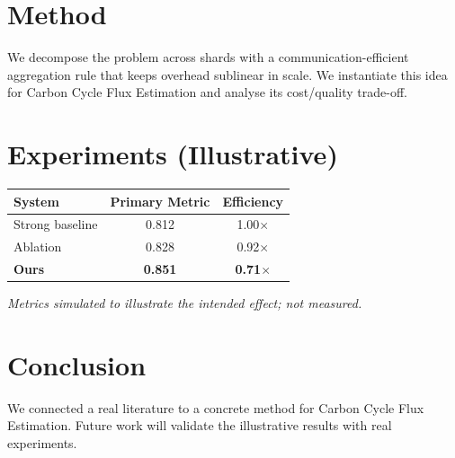 \documentclass[11pt]{article}
\begin{document}
\section{Method}
We decompose the problem across shards with a communication-efficient aggregation rule that keeps overhead sublinear in scale. We instantiate this idea for Carbon Cycle Flux Estimation and analyse its cost/quality trade-off.

\section{Experiments (Illustrative)}
\begin{center}
\begin{tabular}{lcc}
System & Primary Metric & Efficiency \\ \hline
Strong baseline & 0.812 & 1.00$\times$ \\
Ablation & 0.828 & 0.92$\times$ \\
\textbf{Ours} & \textbf{0.851} & \textbf{0.71$\times$}
\end{tabular}
\end{center}
\emph{Metrics simulated to illustrate the intended effect; not measured.}

\section{Conclusion}
We connected a real literature to a concrete method for Carbon Cycle Flux Estimation. Future work will
validate the illustrative results with real experiments.
\end{document}
